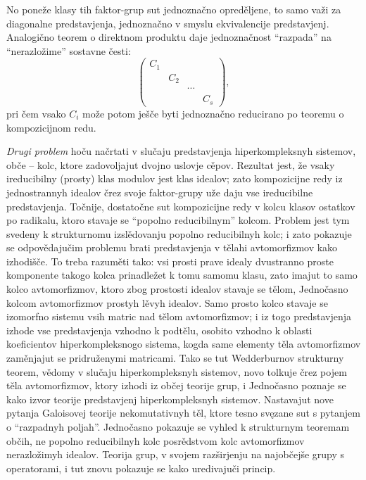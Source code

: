 \documentclass[11pt]{article}
\begin{document}
No poneže klasy tih faktor-grup sut jednoznačno opreděljene, to samo važi za diagonalne predstavjenja, jednoznačno v smyslu ekvivalencije predstavjenj. Analogično teorem o direktnom produktu daje jednoznačnost “razpada” na “nerazložime” sostavne česti:
\[
\begin{pmatrix}
C_1&&&\\
&C_2&&\\
&&\cdots&\\
&&&C_s
\end{pmatrix},
\]
pri čem vsako $C_i$ može potom ješče byti jednoznačno reducirano po teoremu o kompozicijnom redu.

\emph{Drugi problem} hoču načrtati v slučaju predstavjenja hiperkompleksnyh sistemov, obče -- kolc, ktore zadovoljajut dvojno uslovje cěpov. Rezultat jest, že vsaky ireducibilny (prosty) klas modulov jest klas idealov; zato kompozicijne redy iz jednostrannyh idealov črez svoje faktor-grupy uže daju vse ireducibilne predstavjenja. Točnije, dostatočne sut kompozicijne redy v kolcu klasov ostatkov po radikalu, ktoro stavaje se “popolno reducibilnym” kolcom. Problem jest tym svedeny k strukturnomu izslědovanju popolno reducibilnyh kolc; i zato pokazuje se odpovědajučim problemu brati predstavjenja v tělahi avtomorfizmov kako izhodišče. To treba razuměti tako: vsi prosti prave idealy dvustranno proste komponente takogo kolca prinadležet k tomu samomu klasu, zato imajut to samo kolco avtomorfizmov, ktoro zbog prostosti idealov stavaje se tělom, Jednočasno kolcom avtomorfizmov prostyh lěvyh idealov. Samo prosto kolco stavaje se izomorfno sistemu vsih matric nad tělom avtomorfizmov; i iz togo predstavjenja izhode vse predstavjenja vzhodno k podtělu, osobito vzhodno k oblasti koeficientov hiperkompleksnogo sistema, kogda same elementy těla avtomorfizmov zaměnjajut se pridruženymi matricami. Tako se tut Wedderburnov strukturny teorem, vědomy v slučaju hiperkompleksnyh sistemov, novo tolkuje črez pojem těla avtomorfizmov, ktory izhodi iz občej teorije grup, i Jednočasno poznaje se kako izvor teorije predstavjenj hiperkompleksnyh sistemov. Nastavajut nove pytanja Galoisovej teorije nekomutativnyh těl, ktore tesno svęzane sut s pytanjem o “razpadnyh poljah”. Jednočasno pokazuje se vyhled k strukturnym teoremam občih, ne popolno reducibilnyh kolc posrědstvom kolc avtomorfizmov nerazložimyh idealov. Teorija grup, v svojem razširjenju na najobčejše grupy s operatorami, i tut znovu pokazuje se kako uredivajuči princip.
\end{document}
